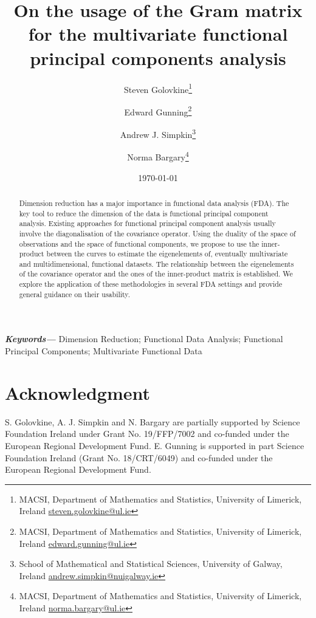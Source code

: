 \documentclass{article}
\title{On the usage of the Gram matrix for the multivariate functional principal components analysis}
\author{%
Steven Golovkine\thanks{MACSI, Department of Mathematics and Statistics, University of Limerick, Ireland \href{mailto:steven.golovkine@ul.ie}{steven.golovkine@ul.ie}}
\and
Edward Gunning\thanks{MACSI, Department of Mathematics and Statistics, University of Limerick, Ireland \href{mailto:edward.gunning@ul.ie}{edward.gunning@ul.ie}}
\and
Andrew J. Simpkin\thanks{School of Mathematical and Statistical Sciences, University of Galway, Ireland \href{mailto:andrew.simpkin@nuigalway.ie}{andrew.simpkin@nuigalway.ie}}
\and
Norma Bargary\thanks{MACSI, Department of Mathematics and Statistics, University of Limerick, Ireland \href{mailto:norma.bargary@ul.ie}{norma.bargary@ul.ie}}
}
\date{\today}
\newcounter{th}
\providecommand{\keywords}[1]{\textbf{\textit{Keywords---}} #1}
\begin{document}
\maketitle

\begin{abstract}
Dimension reduction has a major importance in functional data analysis (FDA). The key tool to reduce the dimension of the data is functional principal component analysis. Existing approaches for functional principal component analysis usually involve the diagonalisation of the covariance operator. Using the duality of the space of observations and the space of functional components, we propose to use the inner-product between the curves to estimate the eigenelements of, eventually multivariate and multidimensional, functional datasets. The relationship between the eigenelements of the covariance operator and the ones of the inner-product matrix is established. We explore the application of these methodologies in several FDA settings and provide general guidance on their usability.
\end{abstract}

\keywords{Dimension Reduction; Functional Data Analysis; Functional Principal Components; Multivariate Functional Data}



% 












\appendix






\section*{Acknowledgment}

S. Golovkine, A. J. Simpkin and N. Bargary are partially supported by Science Foundation Ireland under Grant No. 19/FFP/7002 and co-funded under the European Regional Development Fund. E. Gunning is supported in part Science Foundation Ireland (Grant No. 18/CRT/6049) and co-funded under the European Regional Development Fund.



\end{document}
